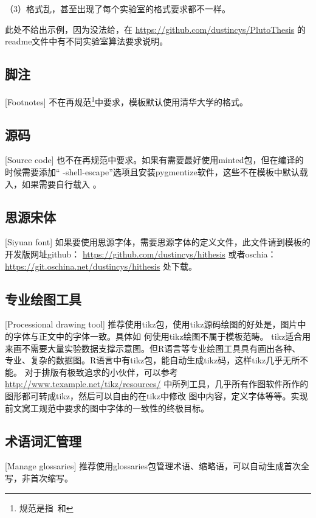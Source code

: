 （3）格式乱，甚至出现了每个实验室的格式要求都不一样。

此处不给出示例，因为没法给，在
\href{https://github.com/dustincys/PlutoThesis}{https://github.com/dustincys/PlutoThesis}
的readme文件中有不同实验室算法要求说明。

\subsection{脚注}[Footnotes]
不在再规范\footnote{规范是指\PGR\ 和\UGR}中要求，模板默认使用清华大学的格式。

\subsection{源码}[Source code]
也不在再规范中要求。如果有需要最好使用minted包，但在编译的时候需要添加“
-shell-escape”选项且安装pygmentize软件，这些不在模板中默认载入，如果需要自行载入
。
\subsection{思源宋体}[Siyuan font]
如果要使用思源字体，需要思源字体的定义文件，此文件请到模板的开发版网址github：
\href{https://github.com/dustincys/hithesis}{https://github.com/dustincys/hithesis}
或者oschia：
\href{https://git.oschina.net/dustincys/hithesis}{https://git.oschina.net/dustincys/hithesis}
处下载。

\subsection{专业绘图工具}[Processional drawing tool]
\label{drawtool}
推荐使用tikz包，使用tikz源码绘图的好处是，图片中的字体与正文中的字体一致。具体如
何使用tikz绘图不属于模板范畴。
tikz适合用来画不需要大量实验数据支撑示意图。但R语言等专业绘图工具具有画出各种、
专业、复杂的数据图。R语言中有tikz包，能自动生成tikz码，这样tikz几乎无所不能。
对于排版有极致追求的小伙伴，可以参考
\href{http://www.texample.net/tikz/resources/}{http://www.texample.net/tikz/resources/}
中所列工具，几乎所有作图软件所作的图形都可转成tikz，然后可以自由的在tikz中修改
图中内容，定义字体等等。实现前文窝工规范中要求的图中字体的一致性的终极目标。


\subsection{术语词汇管理}[Manage glossaries]
推荐使用glossaries包管理术语、缩略语，可以自动生成首次全写，非首次缩写。

